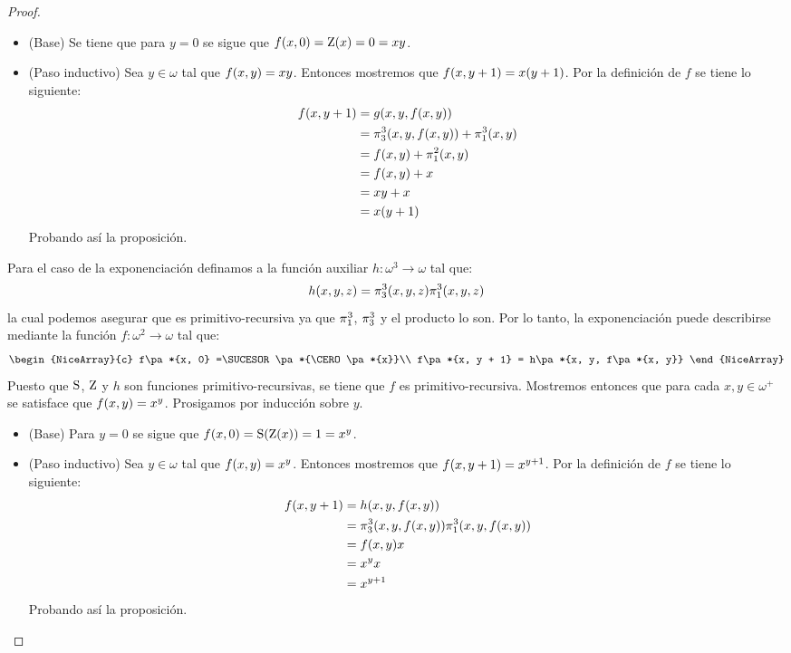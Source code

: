 \begin{proof}
	\begin{itemize}
		\item (Base) Se tiene que para $y = 0$ se sigue que $f\pa*{x, 0} =\CERO\pa*{x} = 0 = xy$.
		\item (Paso inductivo) Sea $y\in\omega$ tal que $f\pa*{x, y} = xy$. Entonces mostremos que $f\pa*{x, y + 1} = x\pa*{y + 1}$. Por la definición de $f$ se tiene lo siguiente:
		\begin{align*}
			f\pa*{x, y + 1} &= g\pa*{x, y, f\pa*{x, y}}\\
			&=\PROYECCION{3}{3}\pa*{x, y, f\pa*{x, y}} +\PROYECCION{3}{1}\pa*{x, y}\\
			&= f\pa*{x, y} +\PROYECCION{2}{1}\pa*{x, y}\\
			&= f\pa*{x, y} + x\\
			&= xy + x\\
			&= x\pa*{y + 1}
		\end{align*}
		Probando así la proposición.
	\end{itemize}

	Para el caso de la exponenciación definamos a la función auxiliar $h:\omega^3\to\omega$ tal que:
	\[
		h\pa*{x, y, z} =\PROYECCION{3}{3}\pa*{x, y, z}\PROYECCION{3}{1}\pa*{x, y, z}
	\]
	la cual podemos asegurar que es primitivo-recursiva ya que $\PROYECCION{3}{1}$, $\PROYECCION{3}{3}$ y el producto lo son. Por lo tanto, la exponenciación puede describirse mediante la función $f:\omega^{2}\to\omega$ tal que:
	\[
		\begin{NiceArray}{c}
			f\pa*{x, 0} =\SUCESOR\pa*{\CERO\pa*{x}}\\
			f\pa*{x, y + 1} = h\pa*{x, y, f\pa*{x, y}}
		\end{NiceArray}
	\]
	Puesto que $\SUCESOR$, $\CERO$ y $h$ son funciones primitivo-recursivas, se tiene que $f$ es primitivo-recursiva. Mostremos entonces que para cada $x, y\in\omega^{+}$ se satisface que $f\pa*{x, y} = x^{y}$. Prosigamos por inducción sobre $y$.

	\begin{itemize}
		\item (Base) Para $y = 0$ se sigue que $f\pa*{x, 0} =\SUCESOR\pa*{\CERO\pa*{x}} = 1 = x^{y}$.
		\item (Paso inductivo) Sea $y\in\omega$ tal que $f\pa*{x, y} = x^{y}$. Entonces mostremos que $f\pa*{x, y + 1} = x^{y + 1}$. Por la definición de $f$ se tiene lo siguiente:
		\begin{align*}
			f\pa*{x, y + 1} &= h\pa*{x, y, f\pa*{x, y}}\\
			&=\PROYECCION{3}{3}\pa*{x, y, f\pa*{x, y}}\PROYECCION{3}{1}\pa*{x, y, f\pa*{x, y}}\\
			&= f\pa*{x, y}x\\
			&= x^{y}x\\
			&= x^{y + 1}
		\end{align*}
		Probando así la proposición.
	\end{itemize}


\end{proof}
